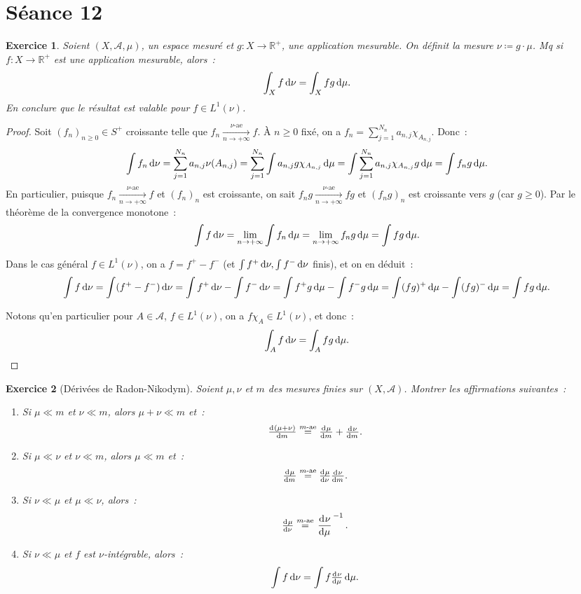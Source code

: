 \documentclass{article}
\newtheorem{ex}{Exercice}[section]
\newcommand{\pinfty}{{+\infty}}
\newcommand{\R}{{\mathbb R}}
\begin{document}
\newpage
\section{Séance 12}
\begin{ex}\label{ex:12.1} Soient $(X, \mathcal A, \mu)$, un espace mesuré et $g : X \to \R^+$, une application mesurable. On définit la mesure $\nu \coloneqq g \cdot \mu$. Mq
si $f : X \to \R^+$ est une application mesurable, alors~:
\[\int_X f\dif\nu = \int_X fg\dif \mu.\]
En conclure que le résultat est valable pour $f \in L^1(\nu)$.
\end{ex}

\begin{proof} Soit $(f_n)_{n \geq 0} \in S^+$ croissante telle que $f_n \xrightarrow[n \to \pinfty]{\nu\text{-ae}} f$. À $n \geq 0$ fixé, on a
$f_n = \sum_{j=1}^{N_n}a_{n,j}\chi_{A_{n,j}}$. Donc~:
\[\int f_n\dif\nu = \sum_{j=1}^{N_n}a_{n,j}\nu(A_{n,j}) = \sum_{j=1}^{N_n}\int a_{n,j}g\chi_{A_{n,j}}\dif\mu = \int\sum_{j=1}^{N_n}a_{n,j}\chi_{A_{n,j}}g\dif\mu = \int f_ng\dif\mu.\]
En particulier, puisque $f_n \xrightarrow[n \to \pinfty]{\nu\text{-ae}} f$ et $(f_n)_n$ est croissante, on sait $f_ng \xrightarrow[n \to \pinfty]{\nu\text{-ae}} fg$ et $(f_ng)_n$ est
croissante vers $g$ (car $g \geq 0$). Par le théorème de la convergence monotone~:
\[\int f\dif\nu = \lim_{n \to \pinfty}\int f_n\dif\mu = \lim_{n \to \pinfty}f_ng\dif\mu = \int fg\dif\mu.\]

Dans le cas général $f \in L^1(\nu)$, on a $f = f^+ - f^-$ (et $\int f^+\dif\nu, \int f^-\dif\nu$ finis), et on en déduit~:
\[\int f\dif\nu = \int (f^+-f^-)\dif\nu = \int f^+\dif\nu - \int f^-\dif\nu = \int f^+g\dif\mu - \int f^-g\dif\mu = \int (fg)^+\dif\mu - \int (fg)^-\dif\mu = \int fg\dif\mu.\]

Notons qu'en particulier pour $A \in \mathcal A$, $f \in L^1(\nu)$, on a $f\chi_A \in L^1(\nu)$, et donc~:
\[\int_Af\dif\nu = \int_A fg\dif\mu.\]
\end{proof}

\begin{ex}[Dérivées de Radon-Nikodym] Soient $\mu, \nu$ et $m$ des mesures finies sur $(X, \mathcal A)$. Montrer les affirmations suivantes~:
\begin{enumerate}
	\item Si $\mu \ll m$ et $\nu \ll m$, alors $\mu+\nu \ll m$ et~:
	\[\od {(\mu+\nu)}m \stackrel {m\text{-ae}}= \od \mu m + \od \nu m.\]
	\item Si $\mu \ll \nu$ et $\nu \ll m$, alors $\mu \ll m$ et~:
	\[\od \mu m \stackrel {m\text{-ae}}= \od \mu\nu\od \nu m.\]
	\item Si $\nu \ll \mu$ et $\mu \ll \nu$, alors~:
	\[\od \mu\nu \stackrel {m\text{-ae}}= \left.\dod \nu\mu\right.^{-1}.\]
	\item Si $\nu \ll \mu$ et $f$ est $\nu$-intégrable, alors~:
	\[\int f\dif\nu = \int f\od \nu\mu\dif\mu.\]
\end{enumerate}
\end{ex}
\end{document}
